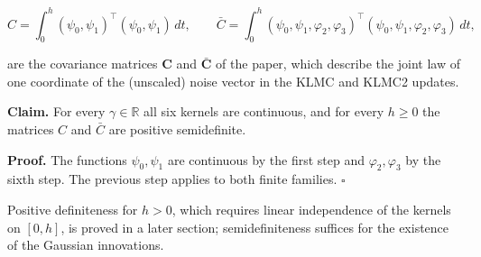 \documentclass[11pt,a4paper]{article}
\begin{document}
\[C=\int_0^h(\psi_0,\psi_1)^\top(\psi_0,\psi_1)\,dt,\qquad\bar C=\int_0^h(\psi_0,\psi_1,\varphi_2,\varphi_3)^\top(\psi_0,\psi_1,\varphi_2,\varphi_3)\,dt,\]


are the covariance matrices \(\mathbf C\) and \(\bar{\mathbf C}\) of the paper, which describe the joint law of one coordinate of the (unscaled) noise vector in the KLMC and KLMC2 updates.




\textbf{Claim.} For every \(\gamma\in\mathbb R\) all six kernels are continuous, and for every \(h\ge0\) the matrices \(C\) and \(\bar C\) are positive semidefinite.




\textbf{Proof.} The functions \(\psi_0,\psi_1\) are continuous by the first step and \(\varphi_2,\varphi_3\) by the sixth step. The previous step applies to both finite families. \(\square\)




Positive definiteness for \(h>0\), which requires linear independence of the kernels on \([0,h]\), is proved in a later section; semidefiniteness suffices for the existence of the Gaussian innovations.
\end{document}
